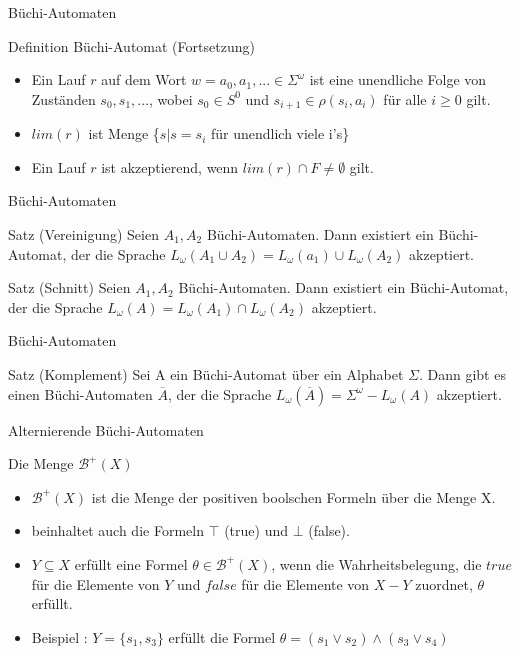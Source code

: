 \begin{frame}{Büchi-Automaten}
\begin{block}{Definition Büchi-Automat (Fortsetzung)}
\begin{itemize}
\item Ein Lauf $r$ auf dem Wort $w=a_0,a_1,...\in \Sigma^\omega$ ist eine unendliche Folge von Zuständen $s_0,s_1,...$, wobei $s_0\in S^0$ und $s_{i+1}\in \rho(s_i,a_i)$ für alle $i\geq0$ gilt.
\item $lim(r)$ ist Menge \{$s|s=s_i$ für unendlich viele i's\}
\item Ein Lauf $r$ ist akzeptierend, wenn $lim(r)\cap F \neq \emptyset$ gilt.
\end{itemize}
\end{block}
\end{frame}

\begin{frame}{Büchi-Automaten} 
\begin{block}{Satz (Vereinigung) \cite{choueka74, vardi+96}}
Seien $A_1, A_2$ Büchi-Automaten. Dann existiert ein Büchi-Automat, der die Sprache $L_{\omega}(A_1\cup A_2)=L_{\omega}(a_1)\cup L_{\omega}(A_2)$ akzeptiert.
\end{block}
\begin{block}{Satz (Schnitt) \cite{choueka74,vardi+96}}
Seien $A_1, A_2$ Büchi-Automaten. Dann existiert ein Büchi-Automat, der die Sprache $L_{\omega}(A)=L_{\omega}(A_1)\cap L_{\omega}(A_2)$ akzeptiert.
\end{block}
\end{frame}

\begin{frame}{Büchi-Automaten} 
\begin{block}{Satz (Komplement) \cite{buechi62,vardi+96}}
Sei A ein Büchi-Automat über ein Alphabet $\Sigma$. Dann gibt es einen Büchi-Automaten $\overline{A}$, der die Sprache $L_\omega(\overline{A})=\Sigma^\omega - L_\omega(A)$ akzeptiert.
\end{block}
\end{frame}

\begin{frame}{Alternierende Büchi-Automaten}
\begin{block}{Die Menge $\mathcal{B}^+(X)$}
\begin{itemize}
\item $\mathcal{B}^+(X)$ ist die Menge der positiven boolschen Formeln über die Menge X.
\item beinhaltet auch die Formeln $\top$ (true) und $\bot$ (false).
\item $Y \subseteq X$ erfüllt eine Formel $\theta \in \mathcal{B}^+(X)$, wenn die Wahrheitsbelegung, die $true$ für die Elemente von $Y$ und $false$ für die Elemente von $X-Y$ zuordnet, $\theta$ erfüllt.
\item Beispiel \cite{vardi+96}: $Y=\{s_1,s_3\}$ erfüllt die Formel $\theta = (s_1 \vee s_2)\wedge (s_3\vee s_4)$\\

\end{itemize}
\end{block}
\end{frame}

